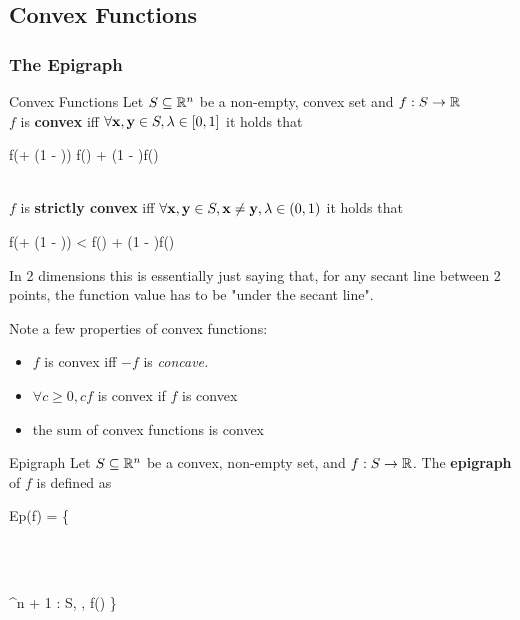 \subsection{Convex Functions}

\subsubsection{The Epigraph}

\begin{defn}{Convex Functions}{}
Let $S \subseteq \mathbb{R}^n$ be a non-empty, convex set and $f: S \rightarrow \mathbb{R}$
\medskip\\
$f$ is \textbf{convex} iff 
		$\forall 
		\mathbf{x}, \mathbf{y} \in S, \lambda \in [0, 1]$ it holds that
		\begin{frml}
		f\big(\lambda\vx + (1 - \lambda)\vy\big) \leq \lambda f(\vx)
		+ (1 - \lambda)f(\vy)
		\end{frml}
		\medskip\\
$f$ is \textbf{strictly convex} iff 
		$\forall 
		\mathbf{x}, \mathbf{y} \in S, \mathbf{x} \neq \mathbf{y}, \lambda \in (0, 1)$ it holds that
		\begin{frml}
		f(\lambda\vx + (1 - \lambda)\vy) < \lambda f(\vx)
		+ (1 - \lambda)f(\vy)
		\end{frml}

\end{defn}
In 2 dimensions
this is essentially just saying that, for any secant line between 2 
points, the function value has to be "under the secant line".

Note a few properties of convex functions:
\begin{itemize}
	\item
		$f$ is convex iff $-f$ is \textit{concave.}
	\item
		$\forall c \geq 0, cf$ is convex if $f$ is convex
	\item
		the sum of convex functions is convex
\end{itemize}

\begin{defn}{Epigraph}{}
Let $S \subseteq \mathbb{R}^n$ be a convex, non-empty set, and 
$f: S \rightarrow \mathbb{R}$. The \textbf{epigraph} of $f$ is defined as
\begin{frml}
Ep(f) = \bigg\{ 
	\begin{bmatrix}
		\vx \\ \beta \\
	\end{bmatrix}
	\in \reals^{n + 1} : \vx \in S, \beta \in \reals, \beta \geq f(\vx)
\bigg\}
\end{frml}
\end{defn}

